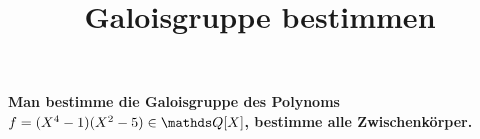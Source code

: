 \documentclass{scrartcl}
\title{Galoisgruppe bestimmen}
\date{}
\author{}
\begin{document}
    \textbf{Man bestimme die Galoisgruppe des Polynoms $f=(X^4-1)(X^2-5)\in \Q[X]$, bestimme alle Zwischenkörper.}  
     
    
    
    
    
\end{document}
